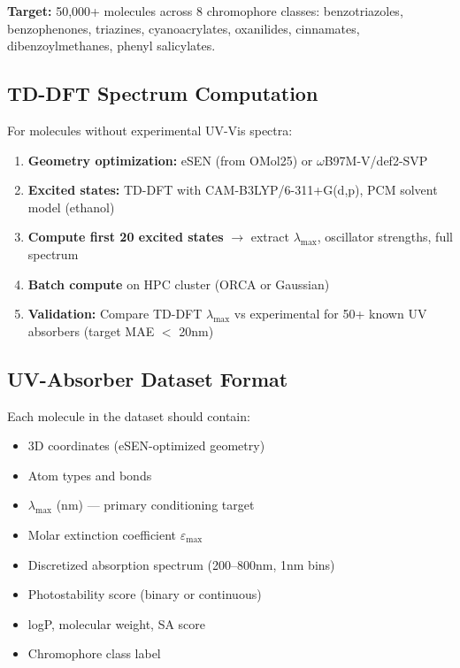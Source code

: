 \documentclass[11pt,a4paper]{article}
\begin{document}
\textbf{Target:} 50,000+ molecules across 8 chromophore classes:
benzotriazoles, benzophenones, triazines, cyanoacrylates, oxanilides,
cinnamates, dibenzoylmethanes, phenyl salicylates.

\subsection{TD-DFT Spectrum Computation}

For molecules without experimental UV-Vis spectra:

\begin{enumerate}[nosep]
    \item \textbf{Geometry optimization:} eSEN (from OMol25) or
          $\omega$B97M-V/def2-SVP
    \item \textbf{Excited states:} TD-DFT with CAM-B3LYP/6-311+G(d,p),
          PCM solvent model (ethanol)
    \item \textbf{Compute first 20 excited states} $\to$ extract
          $\lambda_\text{max}$, oscillator strengths, full spectrum
    \item \textbf{Batch compute} on HPC cluster (ORCA or Gaussian)
    \item \textbf{Validation:} Compare TD-DFT $\lambda_\text{max}$ vs
          experimental for 50+ known UV absorbers (target MAE $<$ 20nm)
\end{enumerate}

\subsection{UV-Absorber Dataset Format}

Each molecule in the dataset should contain:
\begin{itemize}[nosep]
    \item 3D coordinates (eSEN-optimized geometry)
    \item Atom types and bonds
    \item $\lambda_\text{max}$ (nm) --- primary conditioning target
    \item Molar extinction coefficient $\varepsilon_\text{max}$
    \item Discretized absorption spectrum (200--800nm, 1nm bins)
    \item Photostability score (binary or continuous)
    \item logP, molecular weight, SA score
    \item Chromophore class label
\end{itemize}
\end{document}
